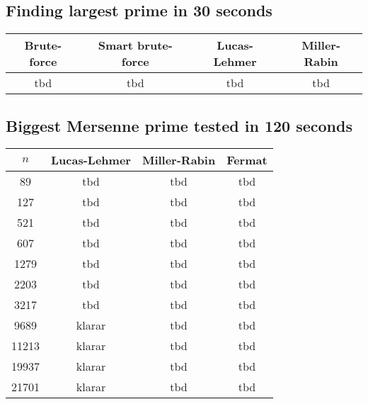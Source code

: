 \documentclass[main.tex]{subfiles}
\begin{document}
\subsection{Finding largest prime in 30 seconds}

\begin{table}[ht!]
    \centering
    \begin{tabular}{||c c c c||} 
        \hline
        Brute-force & Smart brute-force & Lucas-Lehmer & Miller-Rabin \\ [0.5ex] 
        \hline\hline
        tbd & tbd & tbd & tbd\\   [1ex] 
        \hline
    \end{tabular}
\end{table}

\subsection{Biggest Mersenne prime tested in 120 seconds}

\begin{table}[ht!]
    \centering
    \begin{tabular}{||c c c c||} 
        \hline
        $n$ & Lucas-Lehmer & Miller-Rabin & Fermat \\ [0.5ex] 
        \hline\hline
        89 & tbd & tbd & tbd\\
        127 & tbd & tbd & tbd\\
        521 & tbd & tbd & tbd\\
        607 & tbd & tbd & tbd\\
        1279 & tbd & tbd & tbd\\
        2203 & tbd & tbd & tbd\\
        3217 & tbd & tbd & tbd\\
        9689 & klarar & tbd & tbd\\
        11213 & klarar & tbd & tbd\\
        19937 & klarar & tbd & tbd\\
        21701 & klarar & tbd & tbd\\  [1ex] 
        \hline
    \end{tabular}
\end{table}
\end{document}
